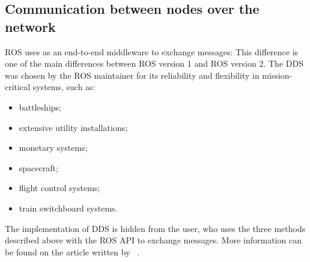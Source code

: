 \documentclass[../thesis.tex]{subfiles}
\begin{document}
\subsection{Communication between nodes over the network}
\gls{ROS} uses  as an end-to-end middleware to exchange messages:  This difference is one of the main differences between \gls{ROS} version 1 and \gls{ROS} version 2. The \gls{DDS} was chosen by the \gls{ROS} maintainer for its reliability and flexibility in mission-critical systems, such as:
\begin{itemize}
    \item battleships;
    \item extensive utility installations;
    \item monetary systems;
    \item spacecraft;
    \item flight control systems;
    \item train switchboard systems.
\end{itemize}
The implementation of \gls{DDS} is hidden from the user, who uses the three methods described above with the \gls{ROS} API to exchange messages. More information can be found on the article written by \citeauthor{site:ros_dds}~\cite{site:ros_dds}.
\end{document}
